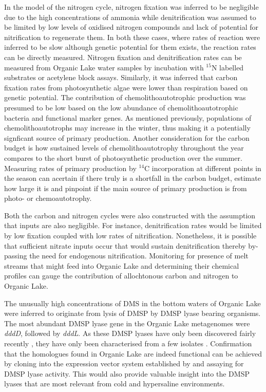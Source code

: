 In the model of the nitrogen cycle, nitrogen fixation was inferred to be negligible due to the high concentrations of ammonia while denitrification was assumed to be limited by low levels of oxidised nitrogen compounds and lack of potential for nitrification to regenerate them.
In both these cases, where rates of reaction were inferred to be slow although genetic potential for them exists, the reaction rates can be directly measured.
Nitrogen fixation and denitrification rates can be measured from Organic Lake water samples by incubation with $^{15}$N labelled substrates or acetylene block assays.
Similarly, it was inferred that carbon fixation rates from photosynthetic algae were lower than respiration based on genetic potential.
The contribution of chemolithoautotrophic production was presumed to be low based on the low abundance of chemolithoautotrophic bacteria and functional marker genes. 
As mentioned previously, populations of chemolithoautotrophs may increase in the winter, thus making it a potentially signficant source of primary production.
Another consideration for the carbon budget is how sustained levels of chemolithoautotrophy throughout the year compares to the short burst of photosynthetic production over the summer.
Measuring rates of primary production by $^{14}$C incorporation at different points in the season can acertain if there truly is a shortfall in the carbon budget, estimate how large it is and pinpoint if the main source of primary production is from photo- or chemoautotrophy.

Both the carbon and nitrogen cycles were also constructed with the assumption that inputs are also negligible.
For instance, denitrification rates would be limited by low fixation coupled with low rates of nitrification.
Nonetheless, it is possible that sufficient nitrate inputs occur that would sustain denitrification thereby by-passing the need for endogenous nitrification.
Monitoring for presence of melt streams that might feed into Organic Lake and determining their chemical profiles can gauge the contribution of allochtonous carbon and nitrogen to Organic Lake.

The unusually high concentrations of \ac{DMS} in the bottom waters of Organic Lake were inferred to originate from lysis of \ac{DMSP} by \ac{DMSP} lyase bearing organisms.
The most abundant \ac{DMSP} lyase gene in the Organic Lake metagenomes were \emph{dddD}, followed by \emph{dddL}.
As these \ac{DMSP} lyases have only been discovered fairly recently \cite{Todd2007, Curson2008}, they have only been characterised from a few isolates \cite{Todd2007, Curson2008, Curson2010, Todd2010, Curson2012}.
Confirmation that the homologues found in Organic Lake are indeed functional can be achieved by cloning into the expression vector system established by \citet{Todd2007} and assaying for \ac{DMSP} lyase activity.
This would also provide valuable insight into the \ac{DMSP} lyases that are most relevant from cold and hypersaline environments.

